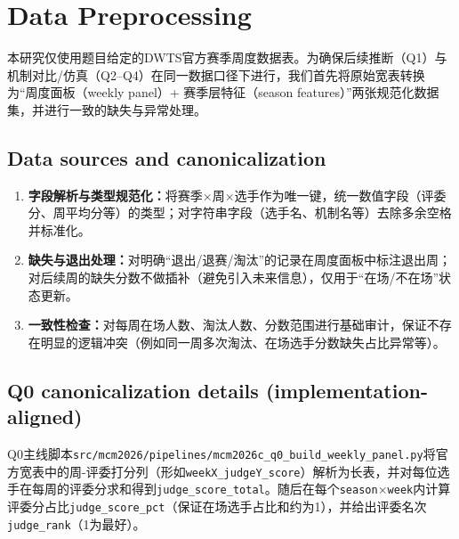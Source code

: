 \newpage
\section{Data Preprocessing}



本研究仅使用题目给定的DWTS官方赛季周度数据表。为确保后续推断（Q1）与机制对比/仿真（Q2--Q4）在同一数据口径下进行，我们首先将原始宽表转换为“周度面板（weekly panel）+ 赛季层特征（season features）”两张规范化数据集，并进行一致的缺失与异常处理。

\subsection{Data sources and canonicalization}
\begin{enumerate}[
    label = (\arabic*),
    itemindent = 0pt,
    labelindent = \parindent,
    labelwidth = 2em,
    labelsep = 5pt,
    leftmargin = 4.5em
    ]
    \item \textbf{字段解析与类型规范化：}将赛季$\times$周$\times$选手作为唯一键，统一数值字段（评委分、周平均分等）的类型；对字符串字段（选手名、机制名等）去除多余空格并标准化。
    \item \textbf{缺失与退出处理：}对明确“退出/退赛/淘汰”的记录在周度面板中标注退出周；对后续周的缺失分数不做插补（避免引入未来信息），仅用于“在场/不在场”状态更新。
    \item \textbf{一致性检查：}对每周在场人数、淘汰人数、分数范围进行基础审计，保证不存在明显的逻辑冲突（例如同一周多次淘汰、在场选手分数缺失占比异常等）。
\end{enumerate}

\subsection{Q0 canonicalization details (implementation-aligned)}
Q0主线脚本\texttt{src/mcm2026/pipelines/mcm2026c\_q0\_build\_weekly\_panel.py}将官方宽表中的周-评委打分列（形如\texttt{weekX\_judgeY\_score}）解析为长表，并对每位选手在每周的评委分求和得到\texttt{judge\_score\_total}。随后在每个\texttt{season$\times$week}内计算评委分占比\texttt{judge\_score\_pct}（保证在场选手占比和约为1），并给出评委名次\texttt{judge\_rank}（1为最好）。

